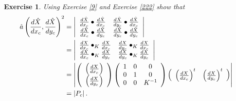 \documentclass{article}%
\newtheorem{exercise}[theorem]{Exercise}
\begin{document}
\begin{exercise}
Using Exercise \ref{9} and Exercise \ref{222} show that%
\begin{align*}
\hat{a}\left(  \frac{d\hat{X}}{dx_{c}},\frac{d\hat{X}}{dy_{c}}\right)  ^{2}
&  =\left\vert
\begin{array}
[c]{cc}%
\frac{d\hat{X}}{dx_{c}}\bullet\frac{d\hat{X}}{dx_{c}} & \frac{d\hat{X}}%
{dy_{c}}\bullet\frac{d\hat{X}}{dx_{c}}\\
\frac{d\hat{X}}{dx_{c}}\bullet\frac{d\hat{X}}{dy_{c}} & \frac{d\hat{X}}%
{dy_{c}}\bullet\frac{d\hat{X}}{dy_{c}}%
\end{array}
\right\vert \\
&  =\left\vert
\begin{array}
[c]{cc}%
\frac{dX}{dx_{c}}\bullet_{K}\frac{dX}{dx_{c}} & \frac{dX}{dy_{c}}\bullet
_{K}\frac{dX}{dx_{c}}\\
\frac{dX}{dx_{c}}\bullet_{K}\frac{dX}{dy_{c}} & \frac{dX}{dy_{c}}\bullet
_{K}\frac{dX}{dy_{c}}%
\end{array}
\right\vert \\
&  =\left\vert \left(
\begin{array}
[c]{c}%
\left(  \frac{dX}{dx_{c}}\right) \\
\left(  \frac{dX}{dy_{c}}\right)
\end{array}
\right)  \left(
\begin{array}
[c]{ccc}%
1 & 0 & 0\\
0 & 1 & 0\\
0 & 0 & K^{-1}%
\end{array}
\right)  \left(
\begin{array}
[c]{cc}%
\left(  \frac{dX}{dx_{c}}\right)  ^{t} & \left(  \frac{dX}{dy_{c}}\right)
^{t}%
\end{array}
\right)  \right\vert \\
&  =\left\vert P_{c}\right\vert .
\end{align*}

\end{exercise}
\end{document}
